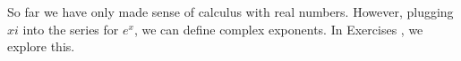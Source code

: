 {\noindent So far we have only made sense of calculus with real numbers.  However, plugging $xi$ into the series for $e^x$, we can define complex exponents.
 In Exercises}
{, we explore this.
}
